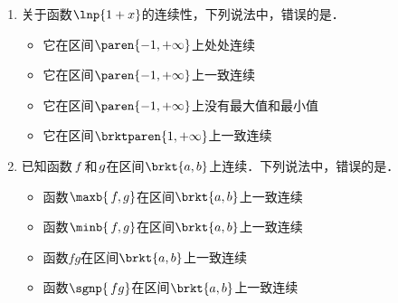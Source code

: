\documentclass[a4paper,punct=CCT]{ctexbook}
\theoremstyle{definition}
\theoremstyle{remark}
\newif\ifshowsol
\let\leq\leqslant
\let\le\leq
\begin{document}
\begin{enumerate}
  \ifshowsol
  由定理~\ref{thm:hc}可知，前三个选项中的函数是一致连续的．关于选项~D中的函数，令\(1/x = 2\,k\pi\)，当\(k\)足够大时，自然能使\(\abs{x-0}\)小于任意的\(\delta\)，然而\(\abs*{\,f(x) - f(0)} = 1\)．因此它不是一致连续的．实际上，如果修改定义，让此函数在原点处的值为零，同样可由定理~\ref{thm:hc}得到一致连续性．
  \fi

\item 关于函数\(\lnp{1+x}\)的连续性，下列说法中，错误的是\uline{\hspace{10em}}．
  \begin{itemize}
    \renewcommand{\labelitemi}{\faCircleThin}
  \item 它在区间\(\paren{-1,+\infty}\)上处处连续
    \ifshowsol
  \item[\faCircle]
    \else
  \item
    \fi
    它在区间\(\paren{-1,+\infty}\)上一致连续
  \item 它在区间\(\paren{-1,+\infty}\)上没有最大值和最小值
  \item 它在区间\(\brktparen{1,+\infty}\)上一致连续
  \end{itemize}

  \ifshowsol
  取出子区间\(\paren{-1,0}\)，再由定理~\ref{thm:unicontbndintvbnd}可知，选项~B中的函数在此子区间上不是一致连续的，自然在原区间上也不是一致连续的．关于选项~D，对于任意的\(\varepsilon > 0\)，有
  \begin{equation*}
    \lnp{1+x+\fwdf x} - \lnp{1+x} = \lnp[\bigg]{1 + \frac{\fwdf x}{1+x}} \le \frac{\fwdf x}{1+x} \le \frac{\fwdf x}{2} \le \fwdf x,
  \end{equation*}
  取\(\delta = \varepsilon\)，则当\(0 \le \fwdf x < \delta\)时，自然有\(\,f(x+\fwdf x) - f(x) < \delta = \varepsilon\)．因此它在区间\(\brktparen{1,+\infty}\)上是一致连续的．
  \fi

\item 已知函数\(\,f\mkern2mu\)和\(\mkern2mu g\)在区间\(\brkt{a,b}\)上连续．下列说法中，错误的是\uline{\hspace{8em}}．
  \begin{itemize}
    \renewcommand{\labelitemi}{\faCircleThin}
  \item 函数\(\maxb{\,f, g}\)在区间\(\brkt{a,b}\)上一致连续
  \item 函数\(\minb{\,f, g}\)在区间\(\brkt{a,b}\)上一致连续
  \item 函数\(fg\)在区间\(\brkt{a,b}\)上一致连续
    \ifshowsol
  \item[\faCircle]
    \else
  \item
    \fi
    函数\(\sgnp{\,fg}\)在区间\(\brkt{a,b}\)上一致连续
  \end{itemize}


\end{enumerate}
\end{document}
